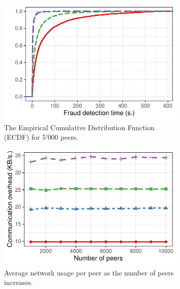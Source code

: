 \begin{figure}[t]
\begin{subfigure}{.5\columnwidth}
		\centering
		\captionsetup{width=.9\linewidth}
		\includegraphics[width=\columnwidth]{trustchain/assets/fraud_times_scalability_5000_ecdf}
		\caption{The Empirical Cumulative Distribution Function (ECDF) for 5'000 peers.}
		\label{fig:experiment_scalability_ecdf_detection_times}
	\end{subfigure}
	\begin{subfigure}{.5\columnwidth}
		\centering
		\captionsetup{width=.9\linewidth}
		\includegraphics[width=\linewidth]{trustchain/assets/scalability_bandwidth_usage}
		\caption{Average network usage per peer as the number of peers increases.}
		\label{fig:experiment_scalability_bandwidth}
	\end{subfigure}%
	\begin{subfigure}{.5\columnwidth}
		\centering
		\captionsetup{width=.9\linewidth}

\end{subfigure}
\end{figure}
